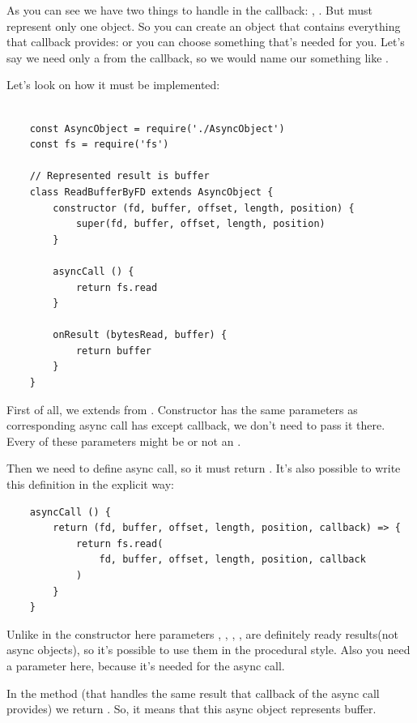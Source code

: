 \documentclass{article}
\begin{document}
As you can see we have two things to handle in the callback: , . But  must represent only one object. So you can create an object that contains everything that callback provides:  or you can choose something that's needed for you. Let's say we need only a  from the callback, so we would name our  something like .

Let's look on how it must be implemented:

\begin{verbatim}

    const AsyncObject = require('./AsyncObject')
    const fs = require('fs')

    // Represented result is buffer
    class ReadBufferByFD extends AsyncObject {
        constructor (fd, buffer, offset, length, position) {
            super(fd, buffer, offset, length, position)
        }

        asyncCall () {
            return fs.read
        }

        onResult (bytesRead, buffer) {
            return buffer
        }
    }
\end{verbatim}

First of all, we extends  from . Constructor has the same parameters as corresponding async call has except callback, we don't need to pass it there. Every of these parameters might be or not an . 

Then we need to define async call, so it must return . It's also possible to write this definition in the explicit way:

\newpage
\begin{verbatim}
    asyncCall () {
        return (fd, buffer, offset, length, position, callback) => {
            return fs.read(
                fd, buffer, offset, length, position, callback
            )
        }
    }
\end{verbatim}

Unlike in the constructor here parameters , , , ,  are definitely ready results(not async objects), so it's possible to use them in the procedural style. Also you need a  parameter here, because it's needed for the async call.

In the method  (that handles the same result that callback of the async call provides) we return . So, it means that this async object represents buffer.
\end{document}

